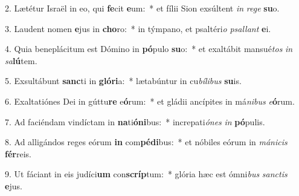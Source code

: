 2. Lætétur Israël in eo, qui \textbf{fe}cit \textbf{e}um:~*  et fílii Sion exsúltent \textit{in} \textit{re}\textit{ge} \textbf{su}o.\

3. Laudent nomen \textbf{e}jus in \textbf{cho}ro:~*  in týmpano, et psaltéri\textit{o} \textit{psal}\textit{lant} \textbf{e}i.\

4. Quia beneplácitum est Dómino in \textbf{pó}pulo \textbf{su}o:~*  et exaltábit mansué\textit{tos} \textit{in} \textit{sa}\textbf{lú}tem.\

5. Exsultábunt \textbf{sanc}ti in \textbf{gló}\textbf{ri}a:~*  lætabúntur in cu\textit{bí}\textit{li}\textit{bus} \textbf{su}is.\

6. Exaltatiónes Dei in gúttu\textbf{re} e\textbf{ó}rum:~*  et gládii ancípites in má\textit{ni}\textit{bus} \textit{e}\textbf{ó}rum.\

7. Ad faciéndam vindíctam in \textbf{na}ti\textbf{ó}\textbf{ni}bus:~*  increpati\textit{ó}\textit{nes} \textit{in} \textbf{pó}pulis.\

8. Ad alligándos reges eórum \textbf{in} com\textbf{pé}\textbf{di}bus:~*  et nóbiles eórum in \textit{má}\textit{ni}\textit{cis} \textbf{fér}reis.\

9. Ut fáciant in eis judíci\textbf{um} con\textbf{scríp}tum:~*  glória hæc est ómni\textit{bus} \textit{sanc}\textit{tis} \textbf{e}jus.\

